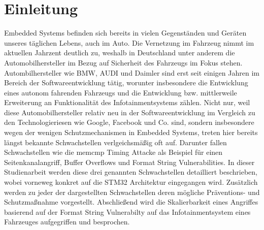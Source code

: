 \documentclass[a4paper,
DIV=13,
12pt,
BCOR=10mm,
department=FakIM,
oneside,
parskip=half,
automark,
listof=totocnumbered,
bibliography=totocnumbered,
acronym=totocnumbered
] {OTHRartcl}
\begin{document}
\section{Einleitung}
\label{sec:Einleitung}
Embedded Systems befinden sich bereits in vielen Gegenständen und Geräten unseres täglichen Lebens, auch im Auto.
Die Vernetzung im Fahrzeug nimmt im aktuellen Jahrzent deutlich zu, weshalb in Deutschland unter anderem die Automobilhersteller im Bezug auf Sicherheit des Fahrzeugs im Fokus stehen.
Autombilhersteller wie BMW, AUDI und Daimler sind erst seit einigen Jahren im Bereich der Softwareentwicklung tätig, worunter insbesondere die Entwicklung eines autonom fahrenden Fahrzeugs und die Entwicklung
bzw. mittlerweile Erweiterung an Funktionalität des Infotainmentsystems zählen. Nicht nur, weil diese Automobilhersteller relativ neu in der Softwareentwicklung im Vergleich zu den Technologieriesen wie Google, Facebook und Co.
sind, sondern insbesondere wegen der wenigen Schutzmechanismen in Embedded Systems, treten hier bereits längst bekannte Schwachstellen verlgeichsmäßig oft auf.
Darunter fallen Schwachstellen wie die memcmp Timing Attacke als Beispiel für einen Seitenkanalangriff, Buffer Overflows und Format String Vulnerabilities.
In dieser Studienarbeit werden diese drei genannten Schwachstellen detailliert beschrieben, wobei vorneweg konkret auf die STM32 Architektur eingegangen wird.
Zusätzlich werden zu jeder der dargestellten Schwachstellen deren mögliche Präventions- und Schutzmaßnahme vorgestellt.
Abschließend wird die Skalierbarkeit eines Angriffes basierend auf der Format String Vulnerabilty auf das Infotainmentsystem eines Fahrzeuges aufgegriffen und besprochen.
\end{document}
